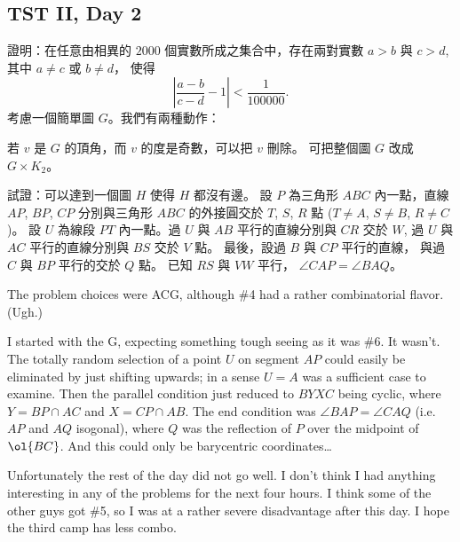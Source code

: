 \documentclass[11pt]{scrreprt}
\begin{document}
\subsection{TST II, Day 2}
\begin{enumerate}
  \setcounter{enumi}{3}
  \ii 證明：在任意由相異的 $2000$ 個實數所成之集合中，存在兩對實數 $a > b$ 與 $c > d$, 其中 $a \neq c$ 或 $b \neq d$， 使得
  \[ \left\lvert \frac{a-b}{c-d} - 1  \right\rvert < \frac{1}{100000}. \] %
  \ii 考慮一個簡單圖 $G$。我們有兩種動作：
  \begin{enumerate}[(1)]
    \ii 若 $v$ 是 $G$ 的頂角，而 $v$ 的度是奇數，可以把 $v$ 刪除。
    \ii 可把整個圖 $G$ 改成 $G \times K_2$。
  \end{enumerate}
  試證：可以達到一個圖 $H$ 使得 $H$ 都沒有邊。 %
  \ii 設 $P$ 為三角形 $ABC$ 內一點，直線 $AP$, $BP$, $CP$ 分別與三角形 $ABC$ 的外接圓交於 $T$, $S$, $R$ 點 ($T \neq A$, $S \neq B$, $R \neq C$)。
  設 $U$ 為線段 $PT$ 內一點。過 $U$ 與 $AB$ 平行的直線分別與 $CR$ 交於 $W$, 過 $U$ 與 $AC$ 平行的直線分別與 $BS$ 交於 $V$ 點。
  最後，設過 $B$ 與 $CP$ 平行的直線， 與過 $C$ 與 $BP$ 平行的交於 $Q$ 點。 已知 $RS$ 與 $VW$ 平行， $\angle CAP = \angle BAQ$。
\end{enumerate}
The problem choices were ACG, although \#4 had a rather combinatorial flavor. (Ugh.)

I started with the G, expecting something tough seeing as it was \#6. It wasn't.
The totally random selection of a point $U$ on segment $AP$ could easily be
eliminated by just shifting upwards; in a sense $U = A$ was a sufficient case to examine.
Then the parallel condition just reduced to $BYXC$ being cyclic, where $Y = BP \cap AC$ and $X = CP \cap AB$.
The end condition was $\angle BAP = \angle CAQ$ (i.e.\ $AP$ and $AQ$ isogonal),
where $Q$ was the reflection of $P$ over the midpoint of $\ol{BC}$.
And this could only be barycentric coordinates\dots

Unfortunately the rest of the day did not go well.
I don't think I had anything interesting in any of the problems for the next four hours.
I think some of the other guys got \#5, so I was at a rather severe disadvantage after this day.
I hope the third camp has less combo.
\end{document}
